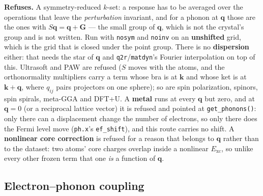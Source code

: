\documentclass[11pt,a4paper]{article}
\newcommand{\code}[1]{\texttt{\small #1}}
\begin{document}
\begin{refuses}
\textbf{Refuses.} A symmetry-reduced $k$-set: a response has to be averaged over
the operations that leave the \emph{perturbation} invariant, and for a phonon at
$\mathbf q$ those are the ones with $S\mathbf q = \mathbf q + \mathbf G$ --- the
small group of $\mathbf q$, which is not the crystal's group and is not written.
Run with \code{nosym} and \code{noinv} on an \textbf{unshifted} grid, which is
the grid that is closed under the point group. There is no \textbf{dispersion}
either: that needs the star of $\mathbf q$ and \code{q2r}/\code{matdyn}'s
Fourier interpolation on top of this. Ultrasoft and PAW are refused ($S$ moves
with the atoms, and the orthonormality multipliers carry a term whose bra is at
$\mathbf k$ and whose ket is at $\mathbf k+\mathbf q$, where $q_{ij}$ pairs
projectors on one sphere); so are spin polarization, spinors, spin
spirals, meta-GGA and DFT+U. A \textbf{metal} runs at every $\mathbf q$ but
zero, and at $\mathbf q = 0$ (or a reciprocal lattice vector) it is refused
and pointed at \code{get\_phonons()}: only there can a displacement change the
number of electrons, so only there does the Fermi level move (\code{ph.x}'s
\code{ef\_shift}), and this route carries no shift. A \textbf{nonlinear core correction} is refused for
a reason that belongs to $\mathbf q$ rather than to the dataset: two atoms' core
charges overlap inside a nonlinear $E_{\mathrm{xc}}$, so unlike every other
frozen term that one \emph{is} a function of $\mathbf q$.
\end{refuses}

\subsection*{Electron--phonon coupling}
\end{document}
